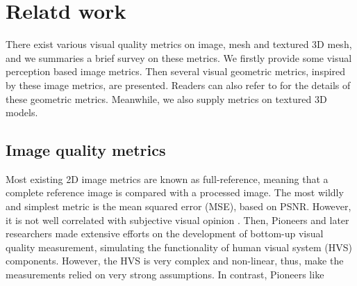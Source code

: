\section{Relatd work}
There exist various visual quality metrics on image, mesh and textured 3D mesh, and we summaries a brief survey on these metrics. We firstly provide some visual perception based image metrics. Then several visual geometric metrics, inspired by these image metrics, are presented. Readers can also refer to \cite{Corsini_2013} for the details of these geometric metrics.  Meanwhile, we also supply metrics on textured 3D models. 
\subsection{Image quality metrics}
Most existing 2D image metrics are known as full-reference, meaning that a complete reference image is compared with a processed image.  The most wildly and simplest metric is the mean squared error (MSE), based on PSNR. However, it is not well correlated with subjective visual opinion \cite{Snyder_1985} \cite{Teo}. Then, Pioneers \cite{Mannos_1974}  and later researchers made extensive efforts on the development of bottom-up visual quality measurement, simulating the functionality of human visual system (HVS) components. However, the HVS is very complex and non-linear, thus, make the measurements relied on very strong assumptions. In contrast, Pioneers like

